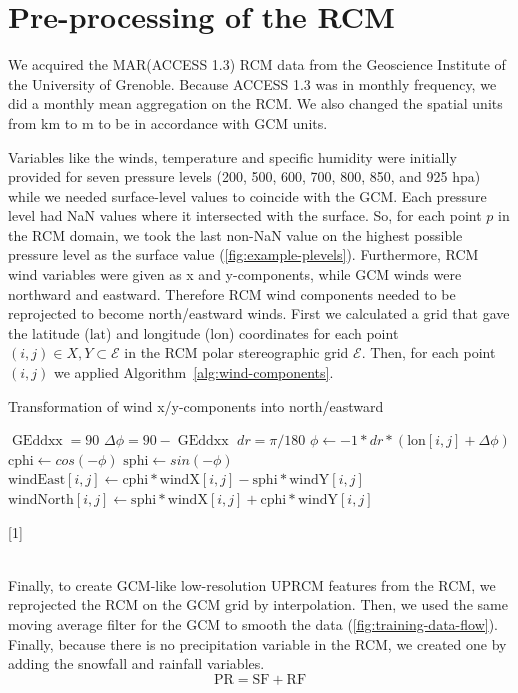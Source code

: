 \documentclass[a4paper,11pt,oneside]{report}
\begin{document}
\section{Pre-processing of the RCM}\label{sec:preproc-RCM}
We acquired the MAR(ACCESS 1.3) RCM data from the Geoscience Institute of the University of Grenoble. Because ACCESS 1.3 was in monthly frequency, we did a monthly mean aggregation on the RCM. We also changed the spatial units from \si{km} to \si{m} to be in accordance with GCM units. 

Variables like the winds, temperature and specific humidity were initially provided for seven pressure levels (200, 500, 600, 700, 800, 850, and 925 \si{hpa}) while we needed surface-level values to coincide with the GCM. Each pressure level had NaN values where it intersected with the surface. So, for each point $p$ in the RCM domain, we took the last non-NaN value on the highest possible pressure level as the surface value (\autoref{fig:example-plevels}). Furthermore, RCM wind variables were given as x and y-components, while GCM winds were northward and eastward. Therefore RCM wind components needed to be reprojected to become north/eastward winds. First we calculated a grid that gave the latitude ($\mathrm{lat}$) and longitude ($\mathrm{lon}$) coordinates for each point $(i,j)\in X,Y \subset \mathcal{E}$ in the RCM polar stereographic grid $\mathcal{E}$. Then, for each point $(i,j)$ we applied Algorithm~\ref{alg:wind-components}.
    \begin{algorithm}
    \caption{Transformation of wind x/y-components into north/eastward}\label{alg:wind-components}
    \begin{algorithmic}[1]
    \State $\operatorname{GEddxx} = 90$
    \State $\Delta \phi = 90 - \operatorname{GEddxx}$
    \State $dr = \pi / 180$ 
    \State $\phi \gets -1*dr*(\mathrm{lon}[i,j] + \Delta \phi)$
    \State $\mathrm{cphi} \gets cos(-\phi)$
    \State $\mathrm{sphi} \gets sin(-\phi)$
    \State  $\mathrm{windEast}[i, j] \gets \mathrm{cphi} * \mathrm{windX}[i, j] - \mathrm{sphi} * \mathrm{windY}[i,j]$ 
    \State $\mathrm{windNorth}[i, j] \gets  \mathrm{sphi} * \mathrm{windX}[i, j] + \mathrm{cphi} * \mathrm{windY}[i, j]$ 
    \EndFor
    \end{algorithmic}[1]
    \end{algorithm}
\\ Finally, to create GCM-like low-resolution UPRCM features from the RCM, we reprojected the RCM on the GCM grid by interpolation. Then, we used the same moving average filter for the GCM to smooth the data (\autoref{fig:training-data-flow}). Finally, because there is no precipitation variable in the RCM, we created one by adding the snowfall and rainfall variables. 
    \begin{equation*}
        \mathrm{PR} = \mathrm{SF} + \mathrm{RF}
    \end{equation*}
\end{document}
